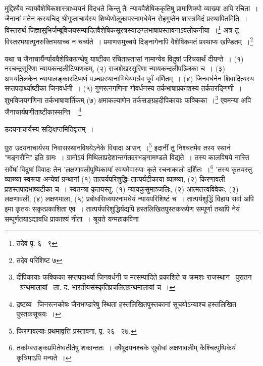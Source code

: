 \documentclass[11pt, openany]{book}
\begin{document}
\newpage
\noindent
मुद्दिश्यैव न्यायवैशेषिकशास्त्राध्ययनं विदधते किन्तु तैः न्यायवैशेषिककृतिषु प्रामाणिक्यो व्याख्या अपि रचिता~। जैनानां मतेन कस्यचिद् {\knu श्रीगुप्ताचार्य}स्य शिष्येणोलूकापरनामधेयेन रोहगुप्तेन शास्त्रमिदं प्रस्थापितमिति~। विस्तरार्थं जिज्ञासुभिर्जम्बूविजयसम्पादितवैशेषिकसूरत्रस्याङ्ग्लभाषाप्रस्तावनाऽवलोकनीया~।\renewcommand{\thefootnote}{३७}\footnote{तदेव पृ. ६ \textendash\ ९} अत्र तु विस्तरभयात्पुनरुक्तिभयाच्च न चर्च्यते~। {\knu प्रमाणसमुच्चये दिङ्नागेनापि} वैशेषिकमतं प्रस्थाप्य खण्डितम्~।\renewcommand{\thefootnote}{३८}\footnote{तदेव परिशिष्ट ७}

यथा च जैनाचार्यैर्न्यायवैशेषिकग्रन्थेषु याष्टीका रचितास्तासां नामान्येव विदुषां परिचयार्थं दीयन्ते~। (१) {\knu नरचन्द्रसूरि}णा {\knu न्यायकन्दलीटिप्पण}कम्, (२) {\knu राजशेखरसूरिणा न्यायकन्दलीपञ्जिका} च~। (३) {\knu अभयतिलकेन न्यायालङ्कारटिप्पणं पञ्चप्रस्थानाभिधेयमत्रैव} पूर्वं वर्णितम्~। (४) जिनवर्धनेन शिवादित्यस्य {\knu सप्तपदार्थ्याष्टीका जिनवर्धनी}~। (५) {\knu गुणरत्नगणिना गोवर्धनस्य तर्कभाषाप्रकाशस्य तर्कतरङ्गिणी~।} शुभविजयगणिना {\knu तर्कभाषावार्तिकम्} (७) {\knu क्षमाकल्याणेन तर्कसङ्ग्रहदीपिका}याः फक्किका~।\renewcommand{\thefootnote}{३९}\footnote{दीपिकायाः फक्किका सप्तपदार्थ्या जिनवर्धनी च मत्सम्पादिते प्रकाशिते च क्रमशः राजस्थान \textendash\ पुरातन \textendash\ ग्रन्थमालायां \textendash\ ला. द. भारतीयसंस्कृतिप्रचलितग्रन्थमालायां च~।} एवमन्या अपि जैनाचार्यप्रणीताष्टीकास्सन्ति~।\renewcommand{\thefootnote}{४०}\footnote{द्रष्टव्य \textendash\ जिनरत्नकोषः जैनभण्डारेषु स्थिता हस्तलिखितपुस्तकानां सूचयोऽन्याश्च हस्तलिखित पुस्तकसूचयः~।}

{\knu उदयनाचार्यस्य सङ्क्षिप्तमितिवृत्तम्~।}

पुरा उदयनाचार्यस्य निवासस्थानविषयेऽनेके विवादा आसन्~।\renewcommand{\thefootnote}{४१}\footnote{किरणावल्याः प्रथमावृत्ति प्रस्तावना, पृ. २६ \textendash\ २७.} इदानीं तु निश्चतमेव तस्य स्थानं {\knu "मङ्गरौनि"} इति ग्रामः~। ग्रामोऽयं मिथिलाप्रदेशान्तर्गतदरभङ्गामण्डले विद्यते~। तस्य कालविषये नास्ति सर्वेषां विदुषां विवादः तेन {\knu 'लक्षणावली}पुष्पिकायां स्वयमेवास्याः कृते रचनाकालो दर्शितः~।\renewcommand{\thefootnote}{४२}\footnote{तर्काम्बराङ्कप्रमितेष्वतीतेषु शकान्ततः~। वर्षेषूदयनश्चके सुबोधां लक्षणावलीम् कैश्चित्पुष्पिकेयं कृत्रिमाऽपि मन्यते~।} 'तस्य कृतयस्तु व्याख्या स्वरूपा अन्येषां ग्रन्थानां (१) तात्पर्यपरिशुद्धिः तात्पर्यटीकाया व्याख्या, (२) किरणावली प्रशस्तपादभाष्यटीका च~। स्वतन्त्रा कृतयस्तु, (१) न्यायकुसुमाञ्जलिः, (२) आत्मतत्त्वविवेकः, (३) लक्षणावली, (४) लक्षणमाला, (५) {\knu प्रबोधसिध्य}परनामधेयं {\knu न्यायपरिशिष्टं} च~। तात्पर्यशुद्धिं विहाय सर्वा अपि इमा कृतयः सकृत्प्रकाशिता एव~। तात्पर्यपरिशुद्धिर्यद्यपि हस्तलिखितपुस्तकरूपेण सम्पूर्णा तथापि नेयं सम्पूर्णतयाऽद्यावधि प्राकाश्यं नीता~। श्रूयते यन्महाकविना
\end{document}
